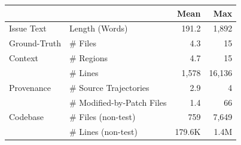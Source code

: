 \footnotesize
\renewcommand{\arraystretch}{1.2}
\setlength{\tabcolsep}{6pt}
\begin{tabular}{@{} l l rr @{}}
  \toprule
  & & \textbf{Mean} & \textbf{Max} \\
  \midrule
  Issue Text & Length (Words) & 191.2 & 1,892 \\
  \midrule
  Ground-Truth & \# Files & 4.3 & 15 \\
  Context & \# Regions & 4.7 & 15 \\
   & \# Lines & 1,578 & 16,136 \\
  \midrule
  Provenance & \# Source Trajectories & 2.9 & 4 \\
   & \# Modified-by-Patch Files & 1.4 & 66 \\
  \midrule
  Codebase & \# Files (non-test) & 759 & 7,649 \\
   & \# Lines (non-test) & 179.6K & 1.4M \\
  \bottomrule
\end{tabular}
